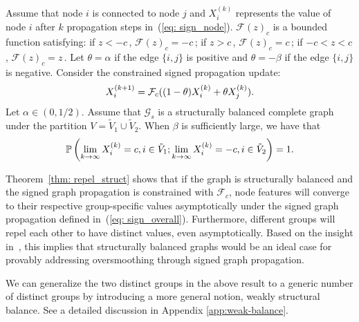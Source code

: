 \begin{theorem}
\label{thm: repel_struct} 
Assume that node $i$ is connected to node $j$ and $X_i^{(k)}$ represents the value of node $i$ after $k$ propagation steps in~(\ref{eq: sign_node}). 
$\mathcal{F}(z)_c$ is a bounded function satisfying: if $z < -c\,$, $\mathcal{F}(z)_c=-c\,$; if $z > c\,$, $\mathcal{F}(z)_c=c\,$; if $-c< z < c \,$, $\mathcal{F}(z)_c=z\,$.
Let $\theta=\alpha$ if the edge $\{i,j\}$ is positive and $\theta=-\beta$ if the edge $\{i,j\}$ is negative.
Consider the constrained signed propagation update:
\begin{equation}
\label{eq: constrained repel dyn}
\small
    X_i^{(k+1)} = \mathcal{F}_c((1-\theta) X_i^{(k)}+\theta X_j^{(k)}).
\end{equation}
Let \(\alpha \in (0,1/2)\). 
Assume that \(\mathcal{G}_s\) is a structurally balanced complete graph under the partition \(V = \tilde{V}_1 \cup \tilde{V}_2\). 
When \(\beta\) is sufficiently large, we have that
\begin{equation}
\small
    \mathbb{P}\left(\lim_{k \to \infty} X_i^{(k)} = c, i \in \tilde{V}_1; \lim_{k \to \infty} X_i^{(k)} = -c, i \in \tilde{V}_2 \right) = 1.
\end{equation}
\end{theorem}
Theorem~\ref{thm: repel_struct} shows that if the graph is structurally balanced and the signed graph propagation is constrained with $\mathcal{F}_c$, node features will converge to their respective group-specific values asymptotically under the signed graph propagation defined in~(\ref{eq: sign_overall}).
Furthermore, different groups will
repel each other to have distinct values, even asymptotically. 
Based on the insight in~\cite{sbm_xinyi}, this implies that structurally balanced graphs would be an ideal case for provably addressing oversmoothing through signed graph propagation.  
\begin{remark}
    We can generalize the two distinct groups in the above result to a generic number of distinct groups by introducing a more general notion, weakly structural balance. See a detailed discussion in Appendix \ref{app:weak-balance}.
\end{remark}




